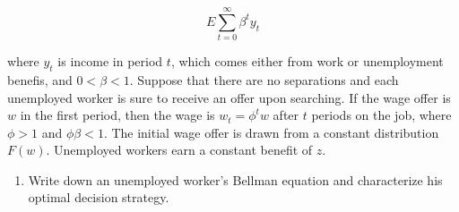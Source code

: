 \documentclass{article}
\newcommand{\sol}[1]{\iftoggle{sol}{{\color{blue} #1 }}{}}
\begin{document}
\begin{equation*}
  E\sum_{t=0}^\infty\beta^ty_t
\end{equation*}

where $y_t$ is income in period $t$, which comes either from work or
unemployment benefis, and $0< \beta<1$. Suppose that there are no
separations and each unemployed worker is sure to receive an offer
upon searching.  If the wage offer is $w$ in the first period, then
the wage is $w_t = \phi^t w$ after $t$ periods on the job, where $\phi> 1$ and
$\phi\beta< 1$.  The initial wage offer is drawn from a constant
distribution $F(w)$. Unemployed workers earn a constant benefit of $z$.
\begin{enumerate}
\item Write down an unemployed worker's Bellman equation and
  characterize his optimal decision strategy.

\sol{

Start with value of an employed worker with wage $w$:
\begin{equation*}
  W(w) = w + \beta\phi w + \beta^2\phi^2 w + ... = \frac{w}{1-\beta\phi}
\end{equation*}

Value of an unemployed:
\begin{equation*}
  U=z+\beta\int_0^\infty \max\{U,\frac{w}{1-\beta\phi}\}dF(w)
\end{equation*}

Optimal decision is to accept if $w>w_R$ and reject if $w<w_R$, where
at $w_R$ worker is indifferent:
$U=W(w_R)=\frac{w_R}{1-\beta\phi}$. Split integral in two parts:

\begin{equation*}
  \frac{w_R}{1-\beta\phi}=z+\beta\int_0^{w_R} \frac{w_R}{1-\beta\phi}dF(w) +
\beta\int_{w_R}^\infty \frac{w}{1-\beta\phi}dF(w)
\end{equation*}

Add and subtract $\beta\int_{w_R}^\infty\frac{w_R}{1-\beta\phi}dF(w)$ to the RHS:

\begin{equation*}
  \frac{w_R}{1-\beta\phi}=z+\beta \frac{w_R}{1-\beta\phi} +
\frac{\beta}{1-\beta\phi}\int_{w_R}^\infty (w-w_R)dF(w)
\end{equation*}

Rearrange and multiply by $(1-\beta\phi)$:

\begin{equation}
  \label{eq:mc}
  (1-\beta)w_R-z(1-\beta\phi) = \int_{w_R}^\infty (w-w_R)dF(w)
\end{equation}

}
\end{enumerate}
\end{document}
